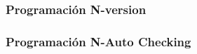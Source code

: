 \begin{comment}
\begin{figure}[h]
 \centering
 \begin{tikzpicture}[node distance=1cm, auto,]
   \tikzset{
   cuadro/.style={
           rectangle,
           draw=black,
           text width=6.5em,
           minimum height=2em,
           text centered},
    arrow/.style={
           ->,
           thick,
           shorten <=2pt,
           shorten >=2pt,}	
    }
       
  \tikzstyle{circulo} = [draw, fill=black, circle, node distance=1cm, minimum size=5pt, inner 
sep=3pt]
    
  \node[inner, sep=5pt] (input1){Entrada 1};
  \node[inner, sep=5pt, below=0.5cm of input1] (input2){Entrada 2};
  \node[inner, sep=5pt, below=0.5cm of input2] (puntos1){...};
  \node[inner, sep=5pt, below=0.5cm of puntos1] (inputn){Entrada n};
  \node[cuadro, right=0.5cm of input1] (version1){Versión 1};
  \node[cuadro, right=0.5cm of input2] (version2){Versión 2};
  \node[inner, sep=5pt, right=2cm of puntos1](puntos2){...};
  \node[cuadro, right=0.5cm of inputn] (versionn){Version n};
  
  \node[cuadro, above=1cm of version1] (check) {Memoria Checkpoint};
  \node[cuadro, right=1cm of version2] (switch) {Swith n a 1};
  \node[inner, sep=0pt, right=1cm of switch](ghost1){};
  \node[cuadro, below=0.5cm of ghost1](test){Test de aceptación};
  
  \node[inner, sep=0pt, right=0.5cm of ghost1](output){Salida};
 
  \draw[arrow] (input1)--(version1);
  \draw[arrow] (input2)--(version2);
  \draw[arrow] (inputn)--(versionn);
  \draw[arrow] (version1)-|(switch.west);
  \draw[arrow] (version2)--(switch);
  \draw[arrow] (versionn)-|(switch.west);
  \draw[arrow] (ghost1)--(test);
  \draw[arrow] (switch)--(output);
  
  \draw[arrow, dashed] (check.-40) -- (version1.30);
  \draw[arrow, dashed] (version1.150) -- (check.-145);
  
  

 \end{tikzpicture}
 \caption{Configuración de bloques de recuperación}
 \label{fig:repPares}
\end{figure}


\end{comment}
\subsubsection{Programación N-version}

\subsubsection{Programación N-Auto Checking}

